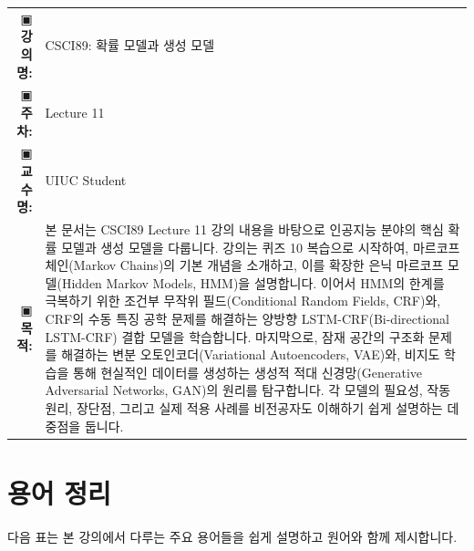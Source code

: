 \documentclass[11pt,a4paper]{article}
\makeatletter
\theoremstyle{definition}
\newcommand{\metainfo}[4]{
\begin{tcolorbox}[
    colback=lightpurple,
    colframe=darkpurple,
    boxrule=1pt,
    arc=2mm,
    left=10pt,
    right=10pt,
    top=8pt,
    bottom=8pt
]
\begin{tabular}{@{}rl@{}}
▣ \textbf{강의명:} & #1 \\[0.3em]
▣ \textbf{주차:} & #2 \\[0.3em]
▣ \textbf{교수명:} & #3 \\[0.3em]
▣ \textbf{목적:} & \begin{minipage}[t]{0.75\textwidth}#4\end{minipage}
\end{tabular}
\end{tcolorbox}
}
\makeatother
\begin{document}
\thispagestyle{firstpage}

\metainfo{CSCI89: 확률 모델과 생성 모델}{Lecture 11}{UIUC Student}{본 문서는 CSCI89 Lecture 11 강의 내용을 바탕으로 인공지능 분야의 핵심 확률 모델과 생성 모델을 다룹니다. 강의는 퀴즈 10 복습으로 시작하여, 마르코프 체인(Markov Chains)의 기본 개념을 소개하고, 이를 확장한 은닉 마르코프 모델(Hidden Markov Models, HMM)을 설명합니다. 이어서 HMM의 한계를 극복하기 위한 조건부 무작위 필드(Conditional Random Fields, CRF)와, CRF의 수동 특징 공학 문제를 해결하는 양방향 LSTM-CRF(Bi-directional LSTM-CRF) 결합 모델을 학습합니다. 마지막으로, 잠재 공간의 구조화 문제를 해결하는 변분 오토인코더(Variational Autoencoders, VAE)와, 비지도 학습을 통해 현실적인 데이터를 생성하는 생성적 적대 신경망(Generative Adversarial Networks, GAN)의 원리를 탐구합니다. 각 모델의 필요성, 작동 원리, 장단점, 그리고 실제 적용 사례를 비전공자도 이해하기 쉽게 설명하는 데 중점을 둡니다.}

\tableofcontents

\newpage

\section{용어 정리}

다음 표는 본 강의에서 다루는 주요 용어들을 쉽게 설명하고 원어와 함께 제시합니다.
\end{document}
